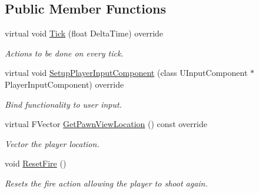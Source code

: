 \subsection*{Public Member Functions}
\begin{DoxyCompactItemize}
\item 
\mbox{\label{class_a_main_character_a44a6be77fb1c8617c144a85fc084ad2b}} 
virtual void \mbox{\hyperlink{class_a_main_character_a44a6be77fb1c8617c144a85fc084ad2b}{Tick}} (float Delta\+Time) override
\begin{DoxyCompactList}\small\item\em Actions to be done on every tick. \end{DoxyCompactList}\item 
\mbox{\label{class_a_main_character_a96eb814e0d995ca16f33e92256756046}} 
virtual void \mbox{\hyperlink{class_a_main_character_a96eb814e0d995ca16f33e92256756046}{Setup\+Player\+Input\+Component}} (class U\+Input\+Component $\ast$Player\+Input\+Component) override
\begin{DoxyCompactList}\small\item\em Bind functionality to user input. \end{DoxyCompactList}\item 
\mbox{\label{class_a_main_character_adb24c0fcbd3fe89d3b246981b16b8b5e}} 
virtual F\+Vector \mbox{\hyperlink{class_a_main_character_adb24c0fcbd3fe89d3b246981b16b8b5e}{Get\+Pawn\+View\+Location}} () const override
\begin{DoxyCompactList}\small\item\em Vector the player location. \end{DoxyCompactList}\item 
\mbox{\label{class_a_main_character_a2e3680c05b799891aa06311103314f40}} 
void \mbox{\hyperlink{class_a_main_character_a2e3680c05b799891aa06311103314f40}{Reset\+Fire}} ()
\begin{DoxyCompactList}\small\item\em Resets the fire action allowing the player to shoot again. \end{DoxyCompactList}\end{DoxyCompactItemize}
